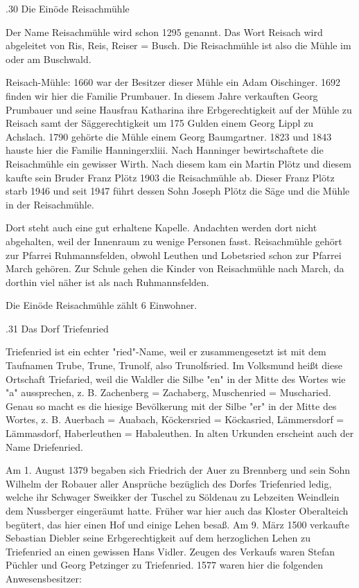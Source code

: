 .30 Die Einöde Reisachmühle

Der Name Reisachmühle wird schon 1295 genannt. Das Wort Reisach wird abgeleitet
von Ris, Reis, Reiser = Busch. Die Reisachmühle ist also die Mühle im oder am
Buschwald.

Reisach-Mühle: 1660 war der Besitzer dieser Mühle ein Adam Oischinger. 1692
finden wir hier die Familie Prumbauer. In diesem Jahre verkauften Georg
Prumbauer und seine Hausfrau Katharina ihre Erbgerechtigkeit auf der Mühle zu
Reisach samt der Säggerechtigkeit um 175 Gulden einem Georg Lippl zu Achslach.
1790 gehörte die Mühle einem Georg Baumgartner. 1823 und 1843 hauste hier die
Familie Hanningerxliii. Nach Hanninger bewirtschaftete die Reisachmühle ein
gewisser Wirth. Nach diesem kam ein Martin Plötz und diesem kaufte sein Bruder
Franz Plötz 1903 die Reisachmühle ab. Dieser Franz Plötz starb 1946 und seit
1947 führt dessen Sohn Joseph Plötz die Säge und die Mühle in der Reisachmühle.

Dort steht auch eine gut erhaltene Kapelle. Andachten werden dort nicht
abgehalten, weil der Innenraum zu wenige Personen fasst. Reisachmühle gehört zur
Pfarrei Ruhmannsfelden, obwohl Leuthen und Lobetsried schon zur Pfarrei March
gehören. Zur Schule gehen die Kinder von Reisachmühle nach March, da dorthin
viel näher ist als nach Ruhmannsfelden.

Die Einöde Reisachmühle zählt 6 Einwohner.

.31 Das Dorf Triefenried

Triefenried ist ein echter "ried"-Name, weil er zusammengesetzt ist mit dem
Taufnamen Trube, Trune, Trunolf, also Trunolfsried. Im Volksmund heißt diese
Ortschaft Triefaried, weil die Waldler die Silbe "en" in der Mitte des Wortes
wie "a" aussprechen, z. B. Zachenberg = Zachaberg, Muschenried = Muscharied.
Genau so macht es die hiesige Bevölkerung mit der Silbe "er" in der Mitte des
Wortes, z. B. Auerbach = Auabach, Köckersried = Köckasried, Lämmersdorf =
Lämmasdorf, Haberleuthen = Habaleuthen. In alten Urkunden erscheint auch der
Name Driefenried.

Am 1. August 1379 begaben sich Friedrich der Auer zu Brennberg und sein Sohn
Wilhelm der Robauer aller Ansprüche bezüglich des Dorfes Triefenried ledig,
welche ihr Schwager Sweikker der Tuschel zu Söldenau zu Lebzeiten Weindlein dem
Nussberger eingeräumt hatte. Früher war hier auch das Kloster Oberalteich
begütert, das hier einen Hof und einige Lehen besaß. Am 9. März 1500 verkaufte
Sebastian Diebler seine Erbgerechtigkeit auf dem herzoglichen Lehen zu
Triefenried an einen gewissen Hans Vidler. Zeugen des Verkaufs waren Stefan
Püchler und Georg Petzinger zu Triefenried. 1577 waren hier die folgenden
Anwesensbesitzer:



